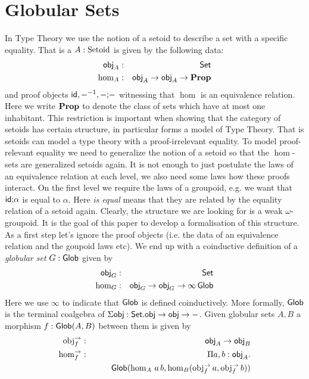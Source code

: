 \section{Globular Sets}
\label{sec:glob}


In Type Theory we use the notion of a setoid to describe a set with a
specific equality. That is a $A : \mathrm{Setoid}$ is given by the
following data:
\begin{eqnarray*}
  \mathsf{obj}_A & : & \mathsf{Set} \\
  \hom_A & : & \mathsf{obj}_A \rightarrow \mathsf{obj}_A \rightarrow \mathbf{Prop}
\end{eqnarray*}
and proof objects $\mathsf{id}, {-}^{-1}, - \text{;} -$ witnessing that $\hom$ is an
equivalence relation. Here we write $\mathbf{Prop}$ to denote the class of sets
which have at most one inhabitant. This restriction is important when
showing that the category of setoids has certain structure, in
particular forms a model of Type Theory. That is setoids can model a
type theory with a proof-irrelevant equality. To model proof-relevant
equality we need to generalize the notion of a setoid so that the
$\hom$-sets are generalized setoids again. It is not enough to just
postulate the laws of an equivalence relation at each level, we also
need some laws how these proofs interact. On the first level we
require the laws of a groupoid, e.g. we want that $\mathsf{id} \text{;} \alpha$ is
equal to $\alpha$. Here \emph{is equal} means that they are related by the
equality relation of a setoid again. Clearly, the structure we are
looking for is a weak $\omega$-groupoid. It is the goal of this paper
to develop a formalisation of this structure. As a first step let's
ignore the proof objects (i.e. the data of an equivalence relation and
the goupoid laws etc).
We end up with a coinductive definition of a \emph{globular set} $G :
\mathsf{Glob}$ given by
\begin{eqnarray*}
  \mathsf{obj}_G & : & \mathsf{Set} \\
  \hom_G & : & \mathsf{obj}_G \rightarrow \mathsf{obj}_G \rightarrow \infty\,\mathsf{Glob}
\end{eqnarray*}
Here we use $\infty$ to indicate that $\mathsf{Glob}$ is defined
coinductively. More formally, $\mathsf{Glob}$ is the terminal coalgebra of
$\Sigma \mathsf{obj} : \mathsf{Set}. \mathsf{obj} \rightarrow \mathsf{obj} \rightarrow -$. Given globular sets
$A,B$ a morphism $f : \mathsf{Glob}(A , B)$ between them is given by 
\begin{eqnarray*}
  \mathrm{obj}^{\rightarrow}_f & : & \mathsf{obj}_A \rightarrow \mathsf{obj}_B \\
  \mathrm{hom}^{\rightarrow}_f & : & \Pi a,b:\mathsf{obj}_A. \\
  && \qquad\mathsf{Glob}(\hom_A\,a\,b,\hom_B(\mathrm{obj}^{\rightarrow}_f\,a,\mathrm{obj}^{\rightarrow}_f\,b))
\end{eqnarray*}
